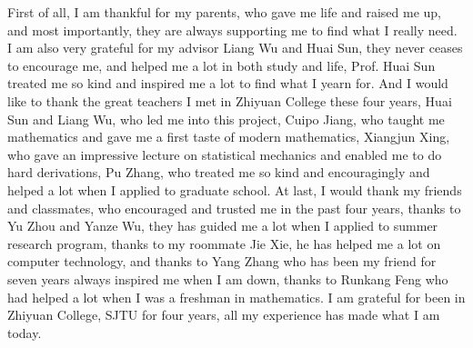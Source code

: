 

\begin{acknowledgements}
	First of all, I am thankful for my parents, who gave me life and raised me up, and most importantly, they are always supporting me to find what I really need. I am also very grateful for my advisor Liang Wu and Huai Sun, they never ceases to encourage me, and helped me a lot in both study and life, Prof. Huai Sun treated me so kind and inspired me a lot to find what I yearn for. And I would like to thank the great teachers I met in Zhiyuan College these four years, Huai Sun and Liang Wu, who led me into this project, Cuipo Jiang, who taught me mathematics and gave me a first taste of modern mathematics, Xiangjun Xing, who gave an impressive lecture on statistical mechanics and enabled me to do hard derivations, Pu Zhang, who treated me so kind and encouragingly and helped a lot when I applied to graduate school. At last, I would thank my friends and classmates, who encouraged and trusted me in the past four years, thanks to Yu Zhou and Yanze Wu, they has guided me a lot when I applied to summer research program, thanks to my roommate Jie Xie, he has helped me a lot on computer technology, and thanks to Yang Zhang who has been my friend for seven years always inspired me when I am down, thanks to Runkang Feng who had helped a lot when I was a freshman in mathematics. I am grateful for been in Zhiyuan College, SJTU for four years, all my experience has made what I am today.
\end{acknowledgements}

